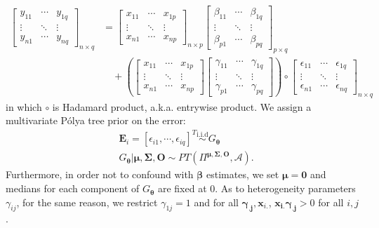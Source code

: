 \documentclass[12pt]{article}
\newcommand{\polya}{P\'{o}lya}
\begin{document}
\begin{align}
  \begin{bmatrix}
    y_{11} &\cdots & y_{1q} \\
    \vdots & \ddots & \vdots \\
    y_{n1} & \cdots & y_{nq}
  \end{bmatrix}_{n\times q} & =
  \begin{bmatrix}
    x_{11} &\cdots & x_{1p} \\
    \vdots & \ddots & \vdots \\
    x_{n1} & \cdots & x_{np}
  \end{bmatrix}_{n\times p}
  \begin{bmatrix}
    \beta_{11} &\cdots & \beta_{1q} \\
    \vdots & \ddots & \vdots \\
    \beta_{p1} & \cdots & \beta_{pq}
  \end{bmatrix}_{p\times q} \nonumber\\
  & \quad + \left( \begin{bmatrix}
      x_{11} &\cdots & x_{1p} \\
      \vdots & \ddots & \vdots \\
      x_{n1} & \cdots & x_{np}
    \end{bmatrix}
    \begin{bmatrix}
      \gamma_{11} &\cdots & \gamma_{1q} \\
      \vdots & \ddots & \vdots \\
      \gamma_{p1} & \cdots & \gamma_{pq}
    \end{bmatrix}
  \right) \circ
  \begin{bmatrix}
    \epsilon_{11} &\cdots & \epsilon_{1q} \\
    \vdots & \ddots & \vdots \\
    \epsilon_{n1} & \cdots & \epsilon_{nq}
  \end{bmatrix}_{n\times q}
\end{align}
in which $\circ$ is Hadamard product, a.k.a. entrywise product. We
assign a multivariate \polya{} tree prior on the error:
\begin{align*}
  &\bm{E}_i = [\epsilon_{i1}, \cdots, \epsilon_{iq}]^T
  \stackrel{\text{i.i.d}}{\sim} G_{\bm{\theta}} \\
  &G_{\bm{\theta}} | \bm{\mu, \Sigma, O} \sim PT \left( \Pi^{\bm{\mu,
        \Sigma, O}}, \mathcal{A} \right).
\end{align*}
Furthermore, in order not to confound with $\bm{\beta}$ estimates, we
set $\bm{\mu} = \bm{0}$ and medians for each component of
$G_{\bm{\theta}}$ are fixed at 0. As to heterogeneity parameters
$\gamma_{ij}$, for the same reason, we restrict $\gamma_{1j}=1$ and
for all $\bm{\gamma_{.j}}, \bm{x}_{i.}$, $\bm{x_{i.}\gamma_{.j}}>0$
for all $i,j$.
\end{document}
